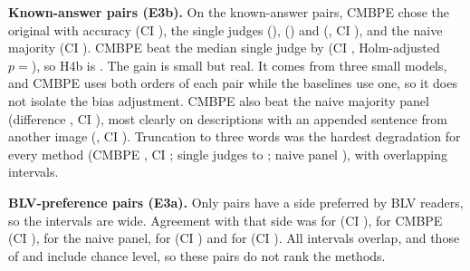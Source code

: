 \textbf{Known-answer pairs (E3b).} On the  known-answer pairs, CMBPE chose the
original with accuracy  (CI ), the single judges
 (\GM),  (\QV) and
 (\MI, CI ), and the
naive majority  (CI ). CMBPE beat the median single
judge by  (CI , Holm-adjusted $p={}$), so H4b is
. The gain is small but real. It comes from three small models, and CMBPE uses
both orders of each pair while the baselines use one, so it does not isolate the bias
adjustment. CMBPE also beat the naive majority panel (difference
, CI ), most clearly on
descriptions with an appended sentence from another image (,
CI ).
Truncation to three words was the hardest degradation for every method (CMBPE
, CI ; single judges
 to ; naive
panel ), with overlapping intervals.

\textbf{BLV-preference pairs (E3a).} Only  pairs have a side preferred by BLV
readers, so the intervals are wide. Agreement with that side was
 for \QV{} (CI ),
 for CMBPE (CI ),  for
the naive panel,  for \MI{} (CI
) and  for \GM{} (CI
). All intervals overlap, and those of \MI{} and \GM{}
include chance level, so these pairs do not rank the methods.

